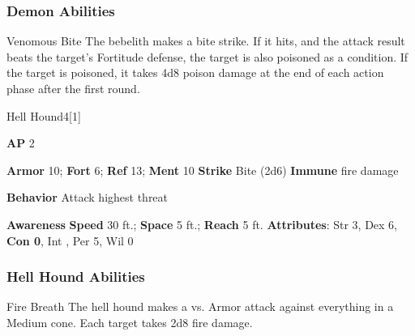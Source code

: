 \subsubsection{Demon Abilities}

\begin{freeability}{Venomous Bite}
The bebelith makes a bite strike.
If it hits, and the attack result beats the target's Fortitude defense, the target is also poisoned as a condition.
If the target is poisoned, it takes 4d8 poison damage at the end of each action phase after the first round.
\end{freeability}

\begin{monsection}{Hell Hound}{4}[1]
\vspace{-1em}\vspace{-1em}
\begin{spellcontent}
\begin{spelltargetinginfo}
{\textbf{AP} 2}

\pari \textbf{Armor} 10;
\textbf{Fort} 6;
\textbf{Ref} 13;
\textbf{Ment} 10
\pari \textbf{Strike} Bite  (2d6)
\pari \textbf{Immune} fire damage


\pari \textbf{Behavior} Attack highest threat
\end{spelltargetinginfo}
\end{spellcontent}

\begin{monsterfooter}
\pari \textbf{Awareness} 
\pari \textbf{Speed} 30 ft.;
\textbf{Space} 5 ft.;
\textbf{Reach} 5 ft.
\pari \textbf{Attributes}:
Str 3,
Dex 6,
\textbf{Con 0},
Int ,
Per 5,
Wil 0
\end{monsterfooter}
\end{monsection}


\subsubsection{Hell Hound Abilities}

\begin{freeability}{Fire Breath}
The hell hound makes a  vs. Armor attack against everything in a Medium cone.
\hit Each target takes 2d8 fire damage.
\end{freeability}

